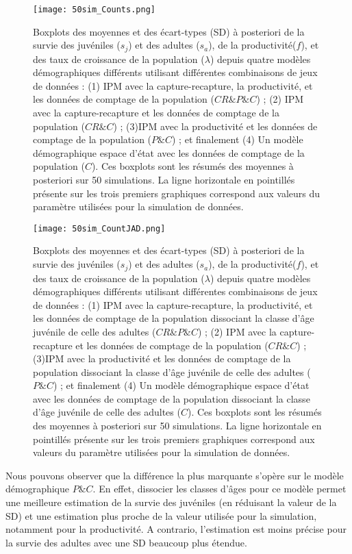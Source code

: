 \documentclass[12pt,a4paper]{article}
\begin{document}
\begin{figure}[!t]
\texttt{[image: 50sim\_Counts.png]}
\caption{Boxplots des moyennes et des écart-types (SD) à posteriori de la survie des juvéniles ($s_j$) et des adultes ($s_a$), de la productivité($f$), et des taux de croissance de la population ($\lambda$) depuis quatre modèles démographiques différents utilisant différentes combinaisons de jeux de données : (1) IPM avec la capture-recapture, la productivité, et les données de comptage de la population ($CR \& P \& C$) ; (2) IPM avec la capture-recapture et les données de comptage de la population ($CR \& C$) ; (3)IPM avec la productivité et les données de comptage de la population ($P \& C$) ; et finalement (4) Un modèle démographique espace d'état avec les données de comptage de la population ($C$). Ces boxplots sont les résumés des moyennes à posteriori sur 50 simulations. La ligne horizontale en pointillés présente sur les trois premiers graphiques correspond aux valeurs du paramètre utilisées pour la simulation de données.}
\end{figure}
\begin{figure}[!t]
\texttt{[image: 50sim\_CountJAD.png]}
\caption{Boxplots des moyennes et des écart-types (SD) à posteriori de la survie des juvéniles ($s_j$) et des adultes ($s_a$), de la productivité($f$), et des taux de croissance de la population ($\lambda$) depuis quatre modèles démographiques différents utilisant différentes combinaisons de jeux de données : (1) IPM avec la capture-recapture, la productivité, et les données de comptage de la population dissociant la classe d'âge juvénile de celle des adultes ($CR \& P \& C$) ; (2) IPM avec la capture-recapture et les données de comptage de la population ($CR \& C$) ; (3)IPM avec la productivité et les données de comptage de la population dissociant la classe d'âge juvénile de celle des adultes ($P \& C$) ; et finalement (4) Un modèle démographique espace d'état avec les données de comptage de la population dissociant la classe d'âge juvénile de celle des adultes ($C$). Ces boxplots sont les résumés des moyennes à posteriori sur 50 simulations. La ligne horizontale en pointillés présente sur les trois premiers graphiques correspond aux valeurs du paramètre utilisées pour la simulation de données.}
\end{figure}

Nous pouvons observer que la différence la plus marquante s'opère sur le modèle démographique $P \& C$. En effet, dissocier les classes d'âges pour ce modèle permet une meilleure estimation de la survie des juvéniles (en réduisant la valeur de la SD) et une estimation plus proche de la valeur utilisée pour la simulation, notamment pour la productivité. A contrario, l'estimation est moins précise pour la survie des adultes avec une SD beaucoup plus étendue.
\end{document}
